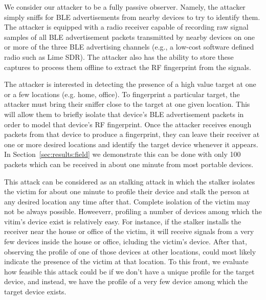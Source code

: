 We consider our attacker to be a fully passive observer. Namely, the attacker
simply sniffs for BLE advertisements from nearby devices to try to identify them.
%
The attacker is equipped with a radio receiver capable of recording raw signal
samples of all BLE advertisement packets transmitted by nearby devices on one
or more of the three BLE advertising channels (e.g., a low-cost software
defined radio such as Lime SDR). The attacker also has the
ability to store these captures to process them offline to extract the RF
fingerprint from the signals.

The attacker is interested in detecting the presence of a high value target at one or a few locations (e.g. home, office). To fingerprint a particular target, the attacker must bring their sniffer close
to the target at one given location. This will allow them to briefly isolate
that device's BLE advertisement packets in order to model that device's RF
fingerprint.  Once the attacker receives enough packets from that device to
produce a fingerprint, they can leave their receiver at one or more desired locations and identify the target device whenever it appears. In Section~\ref{sec:results:field} we demonstrate this
can be done with only 100 packets which can be received in about one minute from most portable devices.  

This attack can be considered as an stalking attack in which the stalker isolates the victim for about one minute to profile their device and stalk the person at any desired location any time after that. Complete isolation of the victim may not be always possible. Howeeverr, profiling a number of devices among which the vitim's device exist is relatively easy. For instance, if the stalker installs the receiver near the house or office of the victim, it will receive signals from a very few devices inside the house or office, icluding the victim's device. After that, observing the profile of one of those devices at other locations, could most likely indicate the presence of the victim at that location. To this front, we evaluate how feasible this attack could be if we don't have a unique profile for the target device, and instead, we have the profile of a very few device among which the target device exists.




